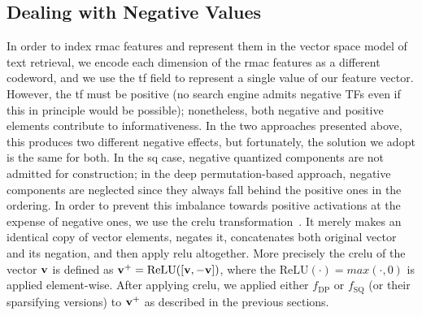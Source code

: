 

\subsection{Dealing with Negative Values}

In order to index \gls{rmac} features and represent them in the vector space model of text retrieval, we encode each dimension of the \gls{rmac} features as a different codeword, and we use the \gls{tf} field to represent a single value of our feature vector.
However, the \gls{tf} must be positive (no search engine admits negative TFs even if this in principle would be possible); nonetheless, both negative and positive elements contribute to informativeness.
In the two approaches presented above, this produces two different negative effects, but fortunately, the solution we adopt is the same for both.
In the \gls{sq} case, negative quantized components are not admitted for construction; in the deep permutation-based approach, negative components are neglected since they always fall behind the positive ones in the ordering.
In order to prevent this imbalance towards positive activations at the expense of negative ones, we use the \gls{crelu} transformation~\cite{shang2016understanding}.
It merely makes an identical copy of vector elements, negates it, concatenates both original vector and its negation, and then apply \gls{relu} altogether.
More precisely the \gls{crelu} of the vector $\mathbf{v}$ is defined as $\mathbf{v}^+ = \text{ReLU}([\mathbf{v}, -\mathbf{v}])$, where the $\text{ReLU}(\cdot) = max(\cdot, 0)$ is applied element-wise.
After applying \gls{crelu}, we applied either $f_\text{DP}$ or $f_\text{SQ}$ (or their sparsifying versions) to $\mathbf{v}^+$ as described in the previous sections.

